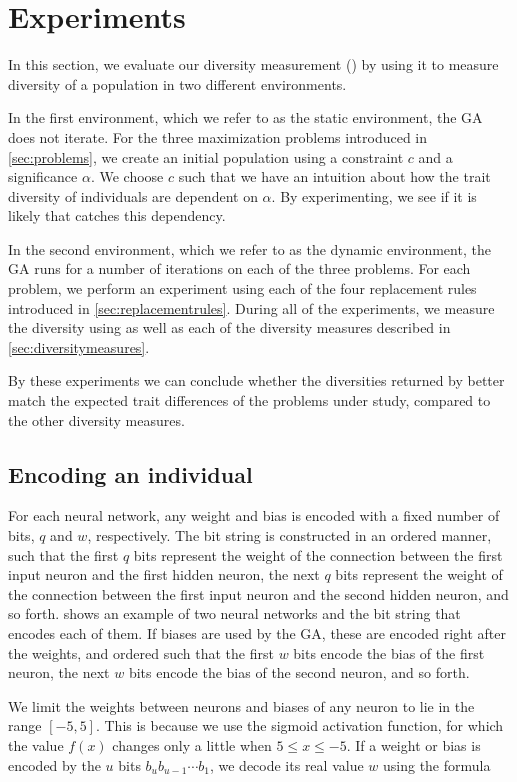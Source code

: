 \section{Experiments}\label{sec:experiments}
In this section, we evaluate our diversity measurement (\dia) by using it to measure diversity of a population in two different environments.

In the first environment, which we refer to as the static environment, the GA does not iterate.
For the three maximization problems introduced in \cref{sec:problems}, we create an initial population using a constraint $c$ and a significance $\alpha$. We choose $c$ such that we have an intuition about how the trait diversity of individuals are dependent on $\alpha$. By experimenting, we see if it is likely that \dia{} catches this dependency.

In the second environment, which we refer to as the dynamic environment, the GA runs for a number of iterations on each of the three problems. 
For each problem, we perform an experiment using each of the four replacement rules introduced in \cref{sec:replacementrules}.
During all of the experiments, we measure the diversity using \dia{} as well as each of the diversity measures described in \cref{sec:diversitymeasures}.

By these experiments we can conclude whether the diversities returned by \dia{} better match the expected trait differences of the problems under study, compared to the other diversity measures.

\subsection{Encoding an individual}
For each neural network, any weight and bias is encoded with a fixed number of bits, $q$ and $w$, respectively. The bit string is constructed in an ordered manner, such that the first $q$ bits represent the weight of the connection between the first input neuron and the first hidden neuron, the next $q$ bits represent the weight of the connection between the first input neuron and the second hidden neuron, and so forth.  shows an example of two neural networks and the bit string that encodes each of them. If biases are used by the GA, these are encoded right after the weights, and ordered such that the first $w$ bits encode the bias of the first neuron, the next $w$ bits encode the bias of the second neuron, and so forth. 

We limit the weights between neurons and biases of any neuron to lie in the range $[-5,5]$.
This is because we use the sigmoid activation function, for which the value $f(x)$ changes only a little when $5 \leq x \leq -5$. If a weight or bias is encoded by the $u$ bits $b_u b_{u-1} \cdots b_1$, we decode its real value $w$ using the formula

